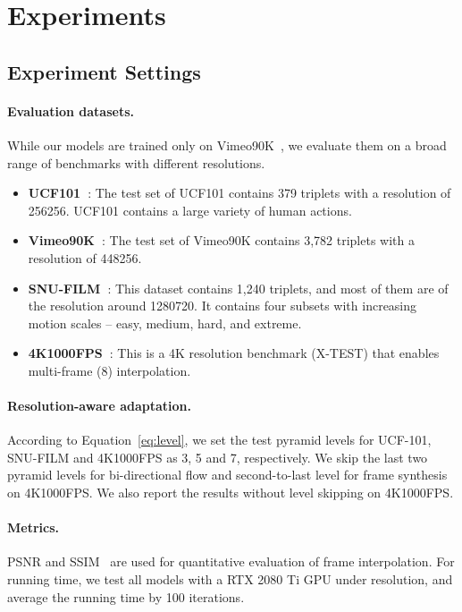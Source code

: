 \documentclass[10pt,twocolumn,letterpaper]{article}
\begin{document}
\section{Experiments}
\label{sec:exp}


\subsection{Experiment Settings}

\paragraph{Evaluation datasets.} While our models are trained only on
Vimeo90K~\cite{xue2019video}, we evaluate them on a broad range of benchmarks with
different resolutions.
\begin{itemize}
    \item \textbf{UCF101~\cite{soomro2012ucf101}}: The test set of UCF101
        contains 379 triplets with a resolution of 256256. UCF101
        contains a large variety of human actions.
    \item \textbf{Vimeo90K~\cite{xue2019video}}: The test set of Vimeo90K
        contains 3,782 triplets with a resolution of 448256.
    \item \textbf{SNU-FILM~\cite{choi2020channel}}: This dataset contains 1,240
        triplets, and most of them are of the resolution around 1280720.
        It contains four subsets with increasing motion scales -- easy, medium,
        hard, and extreme.
    \item \textbf{4K1000FPS~\cite{sim2021xvfi}}: This is a 4K resolution
        benchmark (X-TEST) that enables multi-frame (8) interpolation.
\end{itemize}


\paragraph{Resolution-aware adaptation.} According to Equation~\ref{eq:level},
we set the test pyramid levels for UCF-101, SNU-FILM and 4K1000FPS as 3, 5 and
7, respectively. We skip the last two pyramid levels for
bi-directional flow and second-to-last level for frame synthesis on 4K1000FPS.
We also report the results without level skipping on 4K1000FPS.


\paragraph{Metrics.} PSNR and SSIM~\cite{wang2004image} are used for
quantitative evaluation of frame interpolation. For running time, we test all
models with a RTX 2080 Ti GPU under  resolution, and average the
running time by 100 iterations.
\end{document}
